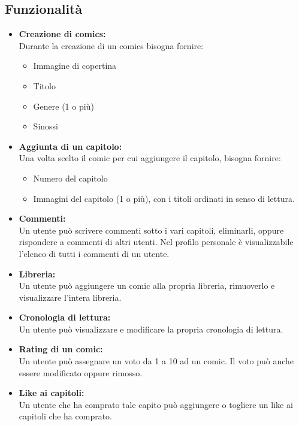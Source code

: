 \subsection{Funzionalità}
\begin{itemize}
    \item \textbf{Creazione di comics:}
          \\Durante la creazione di un comics bisogna fornire:
          \begin{itemize}
              \item Immagine di copertina
              \item Titolo
              \item Genere (1 o più)
              \item Sinossi
          \end{itemize}
    \item \textbf{Aggiunta di un capitolo:}
          \\Una volta scelto il comic per cui aggiungere il capitolo, bisogna fornire:
          \begin{itemize}
              \item Numero del capitolo
              \item Immagini del capitolo (1 o più), con i titoli ordinati in senso di lettura.
          \end{itemize}

    \item \textbf{Commenti:}
          \\Un utente può scrivere commenti sotto i vari capitoli, eliminarli, oppure rispondere a commenti di altri utenti.
          Nel profilo personale è visualizzabile l’elenco di tutti i commenti di un utente.
    \item \textbf{Libreria:}
          \\Un utente può aggiungere un comic alla propria libreria, rimuoverlo e visualizzare l’intera libreria.
    \item \textbf{Cronologia di lettura:}
          \\Un utente può visualizzare e modificare la propria cronologia di lettura.
    \item \textbf{Rating di un comic:}
          \\ Un utente può assegnare un voto da 1 a 10 ad un comic. Il voto può anche essere modificato oppure rimosso.
    \item \textbf{Like ai capitoli:}
          \\Un utente che ha comprato tale capito può aggiungere o togliere un like ai capitoli che ha comprato.


\end{itemize}
